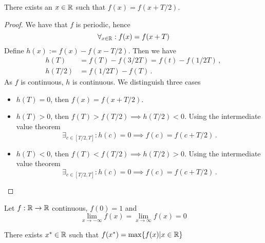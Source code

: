 \documentclass[week=6]{homework}
\begin{document}
\begin{questions}
        \begin{toprove}
        	There exists an $x \in \mathbb{R}$ such that $f(x) = f(x + T/2)$.
        \end{toprove}
	    \begin{proof}
	    	We have that $f$ is periodic, hence
	    	\[
		    	\forall_{x\in\mathbb{R}}: f(x) = f(x+T)
	    	\]
	    	Define $h(x) := f(x) - f(x-T/2)$. Then we have
	    	\begin{align*}
	    		h(T) &= f(T) - f(3/2 T) = f(t) - f(1/2T)\,, \\
	    		h(T/2) &= f(1/2T) - f(T)\,.
	    	\end{align*}
	    	As $f$ is continuous, $h$ is continuous. We distinguish three cases
	    	\begin{itemize}
	    		\item $h(T) = 0$, then $f(x) = f(x+T/2)$.
	    		\item $h(T) > 0$, then $f(T) > f(T/2) \implies h(T/2) < 0$.
	    		Using the intermediate value theorem
	    		\[
		    		\exists_{c \in [T/2,T]}: h(c) = 0 \implies f(c) = f(c + T/2)\,.
	    		\]
	    		\item $h(T) < 0$, then $f(T) < f(T/2) \implies h(T/2) > 0$.
	    		Using the intermediate value theorem
	    		\[
	    		\exists_{c \in [T/2,T]}: h(c) = 0 \implies f(c) = f(c + T/2)\,.
	    		\]
	    	\end{itemize}
	    \end{proof}
        
        \question
        Let $f : \mathbb{R} \to \mathbb{R}$ continuous, $f(0) = 1$ and 
        \[
	        \lim_{x \to - \infty} f(x) = \lim_{x \to  \infty} f(x) = 0
        \]
        \begin{toprove}
        	There exists $x^* \in \mathbb{R}$ such that $f(x^*) = \max\{f(x) | x \in \mathbb{R} \}$
        \end{toprove}
        

\end{questions}
\end{document}

